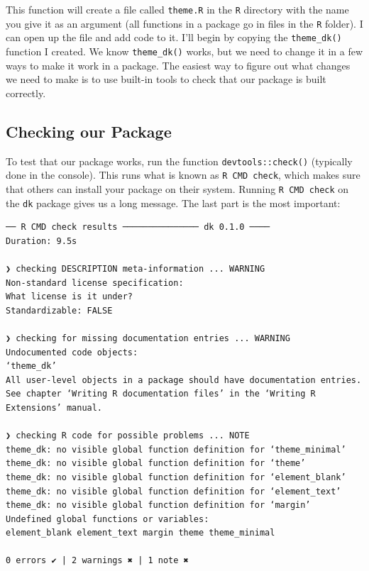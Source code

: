 \documentclass[
]{book}
\begin{document}
This function will create a file called \texttt{theme.R} in the \texttt{R} directory with the name you give it as an argument (all functions in a package go in files in the \texttt{R} folder). I can open up the file and add code to it. I'll begin by copying the \texttt{theme\_dk()} function I created. We know \texttt{theme\_dk()} works, but we need to change it in a few ways to make it work in a package. The easiest way to figure out what changes we need to make is to use built-in tools to check that our package is built correctly.

\hypertarget{checking-our-package}{%
\subsection*{Checking our Package}\label{checking-our-package}}

To test that our package works, run the function \texttt{devtools::check()} (typically done in the console). This runs what is known as \texttt{R\ CMD\ check}, which makes sure that others can install your package on their system. Running \texttt{R\ CMD\ check} on the \texttt{dk} package gives us a long message. The last part is the most important:

\begin{verbatim}
── R CMD check results ─────────────── dk 0.1.0 ────
Duration: 9.5s

❯ checking DESCRIPTION meta-information ... WARNING
Non-standard license specification:
What license is it under?
Standardizable: FALSE

❯ checking for missing documentation entries ... WARNING
Undocumented code objects:
‘theme_dk’
All user-level objects in a package should have documentation entries.
See chapter ‘Writing R documentation files’ in the ‘Writing R
Extensions’ manual.

❯ checking R code for possible problems ... NOTE
theme_dk: no visible global function definition for ‘theme_minimal’
theme_dk: no visible global function definition for ‘theme’
theme_dk: no visible global function definition for ‘element_blank’
theme_dk: no visible global function definition for ‘element_text’
theme_dk: no visible global function definition for ‘margin’
Undefined global functions or variables:
element_blank element_text margin theme theme_minimal

0 errors ✔ | 2 warnings ✖ | 1 note ✖
\end{verbatim}
\end{document}
